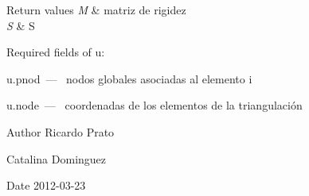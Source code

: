 \begin{DoxyRetVals}{Return values}
{\em M} & matriz de rigidez \\
\hline
{\em S} & S\\
\hline
\end{DoxyRetVals}
\begin{DoxyParagraph}{Required fields of u\-:}
\begin{DoxyItemize}
\item {\ttfamily u.\-pnod~---~} nodos globales asociadas al elemento i \item {\ttfamily u.\-node~---~} coordenadas de los elementos de la triangulación \end{DoxyItemize}

\end{DoxyParagraph}
\begin{DoxyAuthor}{Author}
Ricardo Prato 

Catalina Dominguez 
\end{DoxyAuthor}
\begin{DoxyDate}{Date}
2012-\/03-\/23 
\end{DoxyDate}
